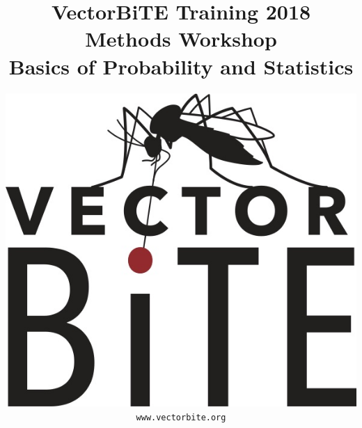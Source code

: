 \documentclass[12pt,xcolor=svgnames]{beamer}
\newcommand{\rd}{\color{red}}
\newcommand{\org}{\color{Orange}}
\newcommand{\gr}{\color{gray}}
\newcommand{\theme}{\color{FireBrick}}
\begin{document}
{ \usebackgroundtemplate{}%
\thispagestyle{empty}
\setcounter{page}{0}


\title{\theme \Large \vskip 0.5cm
{\bf VectorBiTE Training 2018 \\ Methods Workshop}\\
\bigskip
\bf {\sf \gr Basics of Probability and Statistics}}

\author{
\begin{center}
\includegraphics[scale=0.15,trim=10 10 0 150]{VB_logo}
\end{center}
\texttt{\rd\small www.vectorbite.org}
}
\date{}
\maketitle 
}
\end{document}
